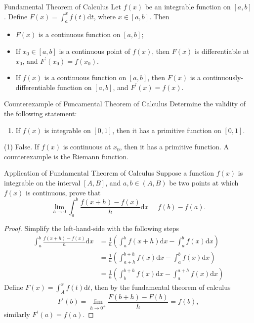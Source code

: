 \begin{theorem}{Fundamental Theorem of Calculus}{}
  Let $f(x)$ be an integrable function on $[a, b]$.
  Define $F(x) = \int_a^x f(t)\mathrm{d} t$,
  where $x \in [a, b]$. Then
  \begin{itemize}
  \item $F(x)$ is a continuous function on $[a, b]$;
  \item If $x_0 \in [a, b]$ is a continuous point of $f(x)$,
    then $F(x)$ is differentiable at $x_0$,
    and $F^{\prime}(x_0) = f(x_0)$.
  \item If $f(x)$ is a continuous function on $[a, b]$,
    then $F(x)$ is a continuously-differentiable function on $[a, b]$,
    and $F^{\prime}(x) = f(x)$.
  \end{itemize}
\end{theorem}

\begin{example}{Counterexample of Funcamental Theorem of Calculus}{}
  Determine the validity of the following statement:
  \begin{enumerate}
  \item If $f(x)$ is integrable on $[0, 1]$, then it has a primitive
    function on $[0, 1]$.
  \end{enumerate}
\end{example}

\begin{solution}
  (1) False. If $f(x)$ is continuous at $x_0$, then it has a primitive function.
  A counterexample is the Riemann function.
\end{solution}

\begin{example}{Application of Fundamental Theorem of Calculus}{}
  Suppose a function $f(x)$ is integrable on the interval $[A, B]$,
  and $a, b \in (A, B)$ be two points at which $f(x)$ is continuous, prove that
  \begin{equation}
    \lim \limits _{h \rightarrow 0} \int_a^b \frac{f(x+h) - f(x)}{h}\mathrm{d} x = f(b) - f(a).
  \end{equation}
\end{example}

\begin{proof}
  Simplify the left-hand-side with the following steps
  \begin{align}
    \int_a^b \frac{f(x+h) - f(x)}{h}\mathrm{d} x &= \frac{1}{h} \left( \int_a^b f(x+h)\mathrm{d} x - \int_a^b f(x)\mathrm{d}x \right)\\
    &= \frac{1}{h} \left( \int_{a+h}^{b+h} f(x)\mathrm{d} x - \int_a^b f(x)\mathrm{d} x \right)\\
    &= \frac{1}{h} \left( \int _b^{b+h} f(x)\mathrm{d} x - \int_a^{a+h} f(x)\mathrm{d} x \right)
  \end{align}
  Define $F(x) = \int_A^xf(t)\mathrm{d}t$,
  then by the fundamental theorem of calculus
  \begin{equation}
    F^{\prime}(b) = \lim \limits _{h \rightarrow 0^+} \frac{F(b + h) - F(b)}{h} = f(b),
  \end{equation}
  similarly $F^{\prime}(a) = f(a)$.
\end{proof}

